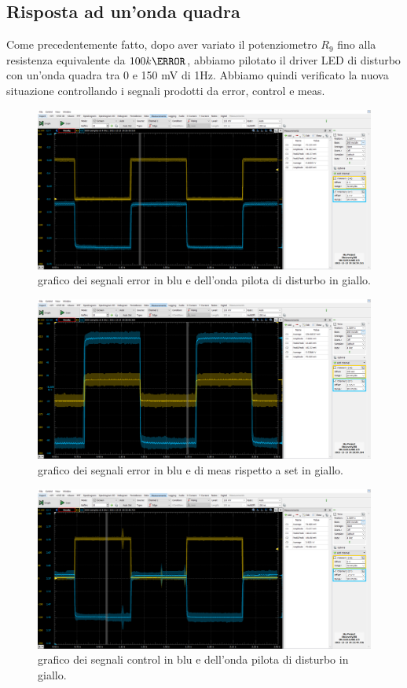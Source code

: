 \documentclass[10pt, a4paper, italian]{article}
\begin{document}
\subsection{Risposta ad un'onda quadra}
Come precedentemente fatto, dopo aver variato il potenziometro $R_9$ fino alla resistenza equivalente da $100 k\ohm$, abbiamo pilotato il driver LED di disturbo con un'onda quadra tra 0 e 150 mV di 1Hz. Abbiamo quindi verificato la nuova situazione controllando i segnali prodotti da error, control e meas.
\begin{figure}[H]
    \centering
	\includegraphics[scale=0.4]{proportional}
    \caption{grafico dei segnali error in blu e dell'onda pilota di disturbo in giallo.
    \label{fig: Draft1}}
\end{figure}
\begin{figure}[H]
    \centering
	\includegraphics[scale=0.4]{proportional.meas}
    \caption{grafico dei segnali error in blu e di meas rispetto a set in giallo.
    \label{fig: Draft1}}
\end{figure}
\begin{figure}[H]
    \centering
	\includegraphics[scale=0.4]{proportional.control}
    \caption{grafico dei segnali control in blu e dell'onda pilota di disturbo in giallo.
    \label{fig: Draft1}}
\end{figure}
\end{document}
